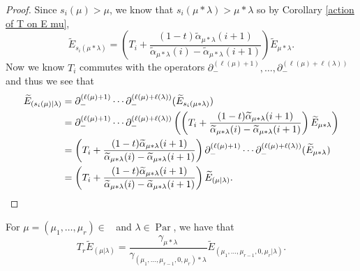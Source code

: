 \documentclass[ALCO,Unicode]{cedram}
\DeclareMathOperator{\Par}{\mathrm{Par}}
\DeclareMathOperator{\Compred}{\mathrm{Comp}^{\textit{red}}}
\begin{document}
\begin{proof}
Since $s_i(\mu) > \mu$, we know that $s_i(\mu*\lambda) > \mu*\lambda$ so by Corollary \ref{action of T on E mu},
$$\widetilde{E}_{s_i(\mu*\lambda)} = 
  \left( T_i + \frac{(1-t)\widetilde{\alpha}_{\mu*\lambda}(i+1)}{\widetilde{\alpha}_{\mu*\lambda}(i)- \widetilde{\alpha}_{\mu*\lambda}(i+1)} \right)  \widetilde{E}_{\mu*\lambda}. $$
Now we know $T_i$ commutes with the operators $\partial_{-}^{(\ell(\mu)+1)},\ldots , \partial_{-}^{(\ell(\mu)+\ell(
\lambda))}$ and thus we see that 
\begin{align*}
    \widetilde{E}_{(s_i(\mu)|\lambda)}&= \partial_{-}^{(\ell(\mu)+1)}\cdots \partial_{-}^{(\ell(\mu)+\ell(
\lambda))} (\widetilde{E}_{s_i(\mu*\lambda)}) \\
&= \partial_{-}^{(\ell(\mu)+1)}\cdots \partial_{-}^{(\ell(\mu)+\ell(
\lambda))} \left( \left( T_i + \frac{(1-t)\widetilde{\alpha}_{\mu*\lambda}(i+1)}{\widetilde{\alpha}_{\mu*\lambda}(i)- \widetilde{\alpha}_{\mu*\lambda}(i+1)} \right)  \widetilde{E}_{\mu*\lambda}\right) \\
&= \left( T_i + \frac{(1-t)\widetilde{\alpha}_{\mu*\lambda}(i+1)}{\widetilde{\alpha}_{\mu*\lambda}(i)- \widetilde{\alpha}_{\mu*\lambda}(i+1)} \right) \partial_{-}^{(\ell(\mu)+1)}\cdots \partial_{-}^{(\ell(\mu)+\ell(
\lambda))}(\widetilde{E}_{\mu*\lambda}) \\
&= \left( T_i + \frac{(1-t)\widetilde{\alpha}_{\mu*\lambda}(i+1)}{\widetilde{\alpha}_{\mu*\lambda}(i)- \widetilde{\alpha}_{\mu*\lambda}(i+1)} \right) \widetilde{E}_{(\mu|\lambda)}. \qedhere
\end{align*}
\end{proof}


\begin{prop}
    For $\mu = (\mu_1,\ldots, \mu_r) \in \Compred$ and $\lambda \in \Par$, we have that
    \begin{equation}
        T_r\widetilde{E}_{(\mu|\lambda)} = \frac{\gamma_{\mu*\lambda}}{\gamma_{(\mu_1,\ldots,\mu_{r-1},0,\mu_r)*\lambda}} \widetilde{E}_{(\mu_1,\ldots,\mu_{r-1},0,\mu_r|\lambda)}.
    \end{equation}
\end{prop}
\end{document}
